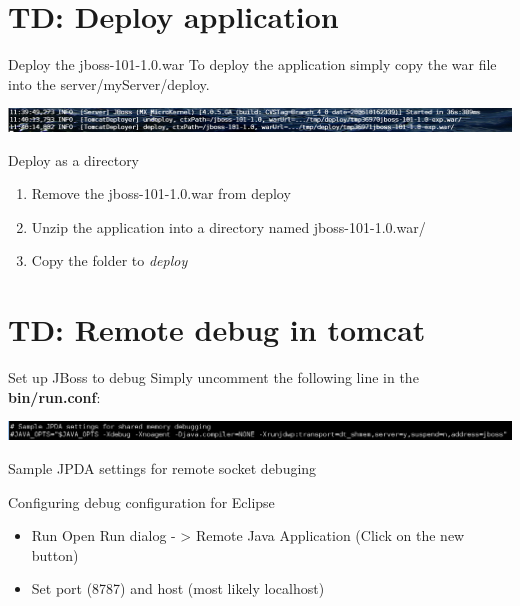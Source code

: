 \documentclass[handout]{beamer}
\begin{document}
\section{TD: Deploy application}
	\begin{frame}
		\begin{block}{Deploy the jboss-101-1.0.war}
		 	To deploy the application simply copy the war file into the server/myServer/deploy.
		\end{block}
		\begin{center}
			\includegraphics[scale=0.25]{../img/deploy-app.png}
		\end{center}
		\begin{block}{Deploy as a directory}
			\begin{enumerate}
				\item Remove the jboss-101-1.0.war from deploy
				\item Unzip the application into a directory named jboss-101-1.0.war/
				\item Copy the folder to \textit{deploy}
			\end{enumerate}
		\end{block}
	\end{frame}
\section{TD: Remote debug in tomcat}
	\begin{frame}
		\begin{block}{Set up JBoss to debug}
		 	Simply uncomment the following line in the \textbf{bin/run.conf}:
			\begin{center}
				\includegraphics[scale=0.25]{../img/debugMode.png}
			\end{center}
			Sample JPDA settings for remote socket debuging
			
		\end{block}

		\begin{block}{Configuring debug configuration for Eclipse}
			\begin{itemize}
				\item Run  Open Run dialog - > Remote Java Application (Click on the new button)
				\item Set port (8787) and host (most likely localhost)
			\end{itemize}
		\end{block}
	\end{frame}
\end{document}
